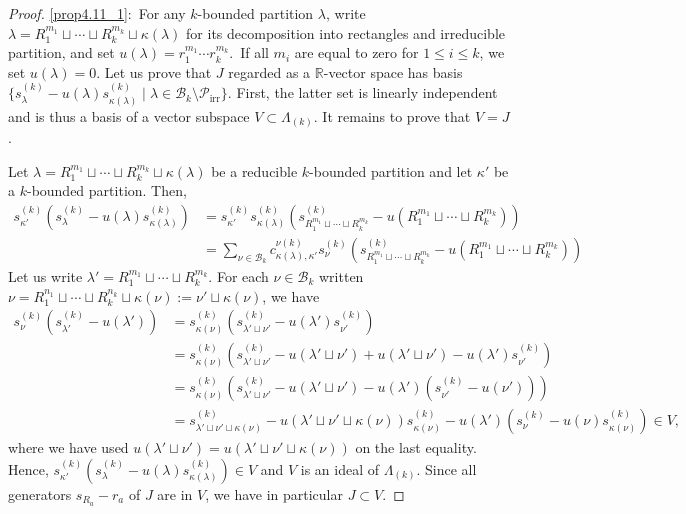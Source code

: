 \documentclass[10pt,a4paper]{amsart}
\theoremstyle{definition}
\DeclareMathOperator{\irr}{irr}
\begin{document}
\begin{proof}
\eqref{prop4.11_1}:~For any $k$-bounded partition $\lambda$, write $\lambda=R_{1}^{m_{1}}%
\sqcup\cdots\sqcup R_{k}^{m_{k}}\sqcup\kappa(\lambda)$ for its decomposition into
rectangles and irreducible partition, and set $u(\lambda)=r_{1}^{m_{1}}\cdots
r_{k}^{m_{k}}$.\ If all $m_{i}$ are equal to zero for $1\leq i\leq k$, we set $u(\lambda)=0$. Let us prove that $J$ regarded as a $\mathbb{R}$-vector space has basis
$\{s_{\lambda}^{(k)}-u(\lambda)s_{\kappa(\lambda)}^{(k)}\mid\lambda\in \mathcal{B}_{k}\setminus \mathcal{P}_{\irr }\}$. First, the latter set is linearly independent and is thus a basis of a vector subspace $V\subset \Lambda_{(k)}$. It remains to prove that $V=J$. 

Let $\lambda=R_{1}^{m_{1}}%
\sqcup\cdots\sqcup R_{k}^{m_{k}}\sqcup\kappa(\lambda)$ be a reducible $k$-bounded partition and let $\kappa'$ be a $k$-bounded partition. Then,
\begin{align*}
s_{\kappa'}^{(k)} (s_{\lambda}^{(k)}-u(\lambda)s_{\kappa(\lambda)}^{(k)})&=s_{\kappa'}^{(k)}s_{\kappa(\lambda)}^{(k)}\left(s_{R_{1}^{m_{1}}%
\sqcup\cdots\sqcup R_{k}^{m_{k}}}^{(k)}-u(R_{1}^{m_{1}}%
\sqcup\cdots\sqcup R_{k}^{m_{k}})\right)\\
&=\sum_{\nu\in \mathcal{B}_{k}}c_{\kappa(\lambda),\kappa'}^{\nu(k)} s_{\nu}^{(k)}\left(s_{R_{1}^{m_{1}}%
\sqcup\cdots\sqcup R_{k}^{m_{k}}}^{(k)}-u(R_{1}^{m_{1}}%
\sqcup\cdots\sqcup R_{k}^{m_{k}})\right)
\end{align*}
Let us write $\lambda'=R_{1}^{m_{1}}%
\sqcup\cdots\sqcup R_{k}^{m_{k}}$. For each $\nu\in\mathcal{B}_{k}$ written $\nu=R_{1}^{n_{1}}%
\sqcup\cdots\sqcup R_{k}^{n_{k}}\sqcup\kappa(\nu):=\nu'\sqcup \kappa(\nu)$, we have 
\begin{align*}
s_{\nu}^{(k)}(s_{\lambda'}^{(k)}-u(\lambda'))&=s_{\kappa(\nu)}^{(k)}(s_{\lambda'\sqcup \nu'}^{(k)}-u(\lambda')s_{\nu'}^{(k)})\\
&=s_{\kappa(\nu)}^{(k)}\left(s_{\lambda'\sqcup \nu'}^{(k)}-u(\lambda'\sqcup \nu')+u(\lambda'\sqcup \nu')-u(\lambda')s_{\nu'}^{(k)}\right)\\
&=s_{\kappa(\nu)}^{(k)}\left(s_{\lambda'\sqcup \nu'}^{(k)}-u(\lambda'\sqcup \nu')-u(\lambda')(s_{\nu'}^{(k)} -u(\nu'))\right)\\
&=s_{\lambda'\sqcup \nu'\sqcup \kappa(\nu)}^{(k)}-u(\lambda'\sqcup \nu'\sqcup \kappa(\nu))s_{\kappa(\nu)}^{(k)}-u(\lambda')(s_{\nu}^{(k)}-u(\nu)s_{\kappa(\nu)}^{(k)})\in V,
\end{align*}
where we have used $u(\lambda'\sqcup \nu')=u(\lambda'\sqcup \nu'\sqcup \kappa(\nu))$ on the last equality. Hence, $s_{\kappa'}^{(k)} (s_{\lambda}^{(k)}-u(\lambda)s_{\kappa(\lambda)}^{(k)})\in V$ and $V$ is an ideal of $\Lambda_{(k)}$. Since all generators $s_{R_{a}}-r_{a}$ of $J$ are in $V$, we have in particular $J\subset V$. 


\end{proof}
\end{document}
